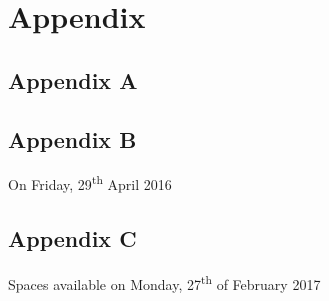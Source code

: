 \chapter*{Appendix}

\section*{Appendix A}
\begin{center}
\end{center}

\pagebreak

\section*{Appendix B}
On Friday, 29\textsuperscript{th} April 2016
\begin{center}
\end{center}

\pagebreak

\section*{Appendix C}
Spaces available on Monday, 27\textsuperscript{th} of February 2017
\begin{center}
\end{center}